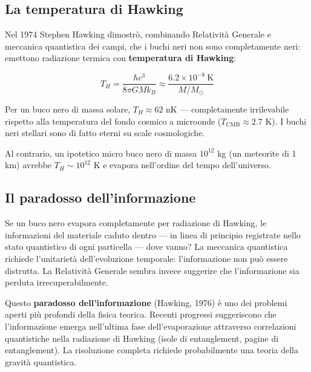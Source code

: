 \documentclass[12pt, a4paper, twoside]{article}
\newenvironment{physbox}[1]{%
  \begin{tcolorbox}[equationbox, title={#1}]
}{%
  \end{tcolorbox}
}
\theoremstyle{definition}
\begin{document}
\subsection{La temperatura di Hawking}

Nel 1974 Stephen Hawking dimostrò, combinando Relatività Generale e meccanica
quantistica dei campi, che i buchi neri non sono completamente neri: emettono
radiazione termica con \textbf{temperatura di Hawking}:

\begin{physbox}{Temperatura di Hawking}
\begin{equation}
  T_H = \frac{\hbar c^3}{8\pi G M k_B}
      \approx \frac{6.2 \times 10^{-8}\ \text{K}}{M/M_\odot}
\end{equation}
\end{physbox}

Per un buco nero di massa solare, $T_H \approx 62$ nK — completamente
irrilevabile rispetto alla temperatura del fondo cosmico a microonde
($T_{\text{CMB}} \approx 2.7$ K). I buchi neri stellari sono di fatto
eterni su scale cosmologiche.

Al contrario, un ipotetico micro buco nero di massa $10^{12}$ kg
(un meteorite di 1 km) avrebbe $T_H \sim 10^{12}$ K e evapora
nell'ordine del tempo dell'universo.

\subsection{Il paradosso dell'informazione}

Se un buco nero evapora completamente per radiazione di Hawking, le
informazioni del materiale caduto dentro — in linea di principio
registrate nello stato quantistico di ogni particella — dove vanno?
La meccanica quantistica richiede l'unitarietà dell'evoluzione temporale:
l'informazione non può essere distrutta. La Relatività Generale sembra
invece suggerire che l'informazione sia perduta irrecuperabilmente.

Questo \textbf{paradosso dell'informazione} (Hawking, 1976) è uno dei
problemi aperti più profondi della fisica teorica. Recenti progressi
suggeriscono che l'informazione emerga nell'ultima fase dell'evaporazione
attraverso correlazioni quantistiche nella radiazione di Hawking (isole
di entanglement, pagine di entanglement). La risoluzione completa richiede
probabilmente una teoria della gravità quantistica.

\newpage

\end{document}
